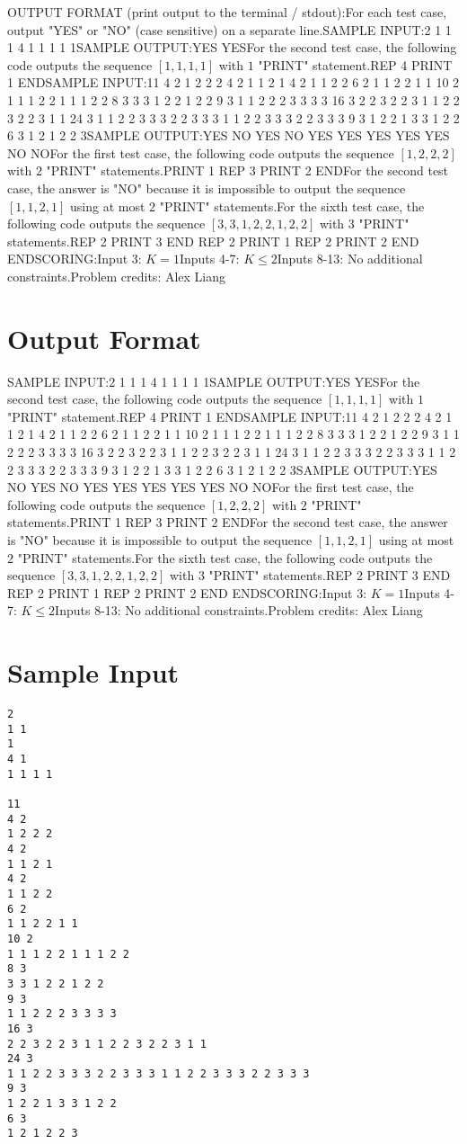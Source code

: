 \documentclass[12pt]{article}
\begin{document}
OUTPUT FORMAT (print output to the terminal / stdout):For each test case, output "YES" or "NO" (case sensitive) on a separate line.SAMPLE INPUT:2
1 1
1
4 1
1 1 1 1SAMPLE OUTPUT:YES
YESFor the second test case, the following code outputs the sequence $[1,1,1,1]$
with $1$ "PRINT" statement.REP 4
    PRINT 1
ENDSAMPLE INPUT:11
4 2
1 2 2 2
4 2
1 1 2 1
4 2
1 1 2 2
6 2
1 1 2 2 1 1
10 2
1 1 1 2 2 1 1 1 2 2
8 3
3 3 1 2 2 1 2 2
9 3
1 1 2 2 2 3 3 3 3
16 3
2 2 3 2 2 3 1 1 2 2 3 2 2 3 1 1
24 3
1 1 2 2 3 3 3 2 2 3 3 3 1 1 2 2 3 3 3 2 2 3 3 3
9 3
1 2 2 1 3 3 1 2 2
6 3
1 2 1 2 2 3SAMPLE OUTPUT:YES
NO
YES
NO
YES
YES
YES
YES
YES
NO
NOFor the first test case, the following code outputs the sequence $[1,2,2,2]$
with $2$ "PRINT" statements.PRINT 1
REP 3
    PRINT 2
ENDFor the second test case, the answer is "NO" because it is impossible to output
the sequence $[1,1,2,1]$ using at most $2$ "PRINT" statements.For the sixth test case, the following code outputs the sequence
$[3,3,1,2,2,1,2,2]$ with $3$ "PRINT" statements.REP 2
    PRINT 3
END
REP 2
    PRINT 1
    REP 2
        PRINT 2
    END
ENDSCORING:Input 3: $K=1$Inputs 4-7: $K \le 2$Inputs 8-13: No
additional constraints.Problem credits: Alex Liang

\section*{Output Format}
SAMPLE INPUT:2
1 1
1
4 1
1 1 1 1SAMPLE OUTPUT:YES
YESFor the second test case, the following code outputs the sequence $[1,1,1,1]$
with $1$ "PRINT" statement.REP 4
    PRINT 1
ENDSAMPLE INPUT:11
4 2
1 2 2 2
4 2
1 1 2 1
4 2
1 1 2 2
6 2
1 1 2 2 1 1
10 2
1 1 1 2 2 1 1 1 2 2
8 3
3 3 1 2 2 1 2 2
9 3
1 1 2 2 2 3 3 3 3
16 3
2 2 3 2 2 3 1 1 2 2 3 2 2 3 1 1
24 3
1 1 2 2 3 3 3 2 2 3 3 3 1 1 2 2 3 3 3 2 2 3 3 3
9 3
1 2 2 1 3 3 1 2 2
6 3
1 2 1 2 2 3SAMPLE OUTPUT:YES
NO
YES
NO
YES
YES
YES
YES
YES
NO
NOFor the first test case, the following code outputs the sequence $[1,2,2,2]$
with $2$ "PRINT" statements.PRINT 1
REP 3
    PRINT 2
ENDFor the second test case, the answer is "NO" because it is impossible to output
the sequence $[1,1,2,1]$ using at most $2$ "PRINT" statements.For the sixth test case, the following code outputs the sequence
$[3,3,1,2,2,1,2,2]$ with $3$ "PRINT" statements.REP 2
    PRINT 3
END
REP 2
    PRINT 1
    REP 2
        PRINT 2
    END
ENDSCORING:Input 3: $K=1$Inputs 4-7: $K \le 2$Inputs 8-13: No
additional constraints.Problem credits: Alex Liang

\section*{Sample Input}
\begin{verbatim}
2
1 1
1
4 1
1 1 1 1

11
4 2
1 2 2 2
4 2
1 1 2 1
4 2
1 1 2 2
6 2
1 1 2 2 1 1
10 2
1 1 1 2 2 1 1 1 2 2
8 3
3 3 1 2 2 1 2 2
9 3
1 1 2 2 2 3 3 3 3
16 3
2 2 3 2 2 3 1 1 2 2 3 2 2 3 1 1
24 3
1 1 2 2 3 3 3 2 2 3 3 3 1 1 2 2 3 3 3 2 2 3 3 3
9 3
1 2 2 1 3 3 1 2 2
6 3
1 2 1 2 2 3
\end{verbatim}
\end{document}
